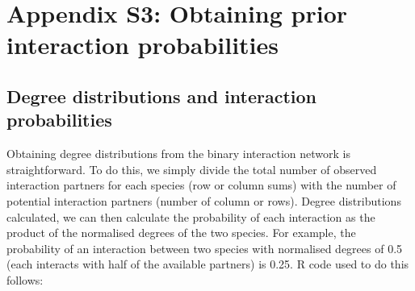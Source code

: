 \documentclass[12pt]{article}
\begin{document}
\section*{Appendix S3: Obtaining prior interaction probabilities}

    \subsection*{Degree distributions and interaction probabilities}

      Obtaining degree distributions from the binary interaction 
      network is straightforward. To do this, we simply divide the 
      total number of observed interaction partners for each 
      species (row or column sums) with the number of potential 
      interaction partners (number of column or rows). Degree 
      distributions calculated, we can then calculate the 
      probability of each interaction as the product of the 
      normalised degrees of the two species. For example, the 
      probability of an interaction between two species with 
      normalised degrees of 0.5 (each interacts with half of the 
      available partners) is 0.25. R code used to do this follows:
\end{document}

